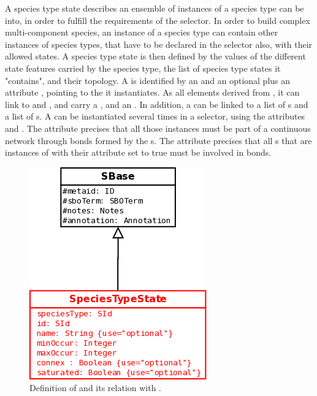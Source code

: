 A species type state describes an ensemble of instances of a species type can be into, in order to fulfill the requirements of the selector. In order to build complex multi-component species, an instance of a species type can contain other instances of species types, that have to be declared in the selector also, with their allowed states. A species type state is then defined by the values of the different state features carried by the species type, the list of species type states it "contains", and their topology.
A  is identified by an  and an optional  plus an attribute , pointing to the  it instantiates. As all elements derived from , it can link to  and , and carry a , and an . In addition, a  can be linked to a list of s and a list of s. A  can be instantiated several times in a selector, using the attributes  and . The attribute  precises that all those instances must be part of a continuous network through bonds formed by the s. The attribute  precises that all s that are instances of  with their attribute  set to true must be involved in bonds. 

\begin{figure}[H]
\begin{center}
\includegraphics[scale=0.3]{figs/pngs/SpeciesTypeStateClass.png} 
\caption{Definition of  and its relation with .}
\label{fig:SpeciesTypeStateClass}
\end{center}
\end{figure}

